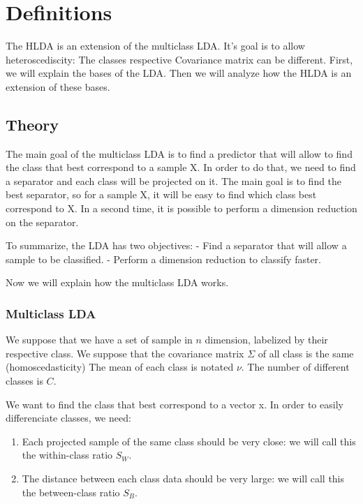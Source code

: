 
\section{Definitions}
\label{sec:definitions}

The HLDA is an extension of the multiclass LDA.
It's goal is to allow heteroscediscity: The classes respective Covariance matrix
can be different.
First, we will explain the bases of the LDA.
Then we will analyze how the HLDA is an extension of these bases.

\subsection{Theory}

The main goal of the multiclass LDA is to find a predictor that will allow to find the class that best correspond to a sample X.
In order to do that, we need to find a separator and each class will be projected on it.
The main goal is to find the best separator, so for a sample X, it will be easy to find which class
best correspond to X.
In a second time, it is possible to perform a dimension reduction on the separator.

To summarize, the LDA has two objectives:
- Find a separator that will allow a sample to be classified.
- Perform a dimension reduction to classify faster.

Now we will explain how the multiclass LDA works. 

\subsubsection{Multiclass LDA}

We suppose that we have a set of sample in $n$ dimension, labelized by their respective
class.
We suppose that the covariance matrix $\Sigma$ of all class is the same (homoscedasticity)
The mean of each class is notated $\nu$.
The number of different classes is $C$.

We want to find the class that best correspond to a vector x.
In order to easily differenciate classes, we need:

\begin{enumerate}
\item Each projected sample of the same class should be very close: we will call this the within-class ratio $S_W$.
\item The distance between each class data should be very large: we will call this the between-class ratio $S_B$.
\end{enumerate}

